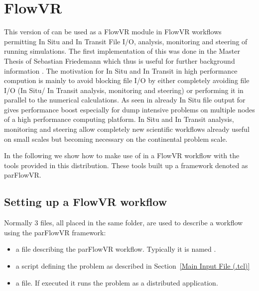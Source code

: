 \chapter{FlowVR}
\label{FlowVR}

This version of \parflow{} can be used as a FlowVR module in FlowVR workflows
\cite{dreherflexible2014}
permitting
In Situ and In Transit File I/O, analysis, monitoring and steering of running simulations.
The first implementation of this was done in the Master Thesis of Sebastian Friedemann
which thus is useful for further background information \cite{thesisFriedemann2018}.
The motivation for In Situ and In Transit in high performance compution is mainly to avoid
blocking file I/O by either completely avoiding file I/O (In Situ/ In Transit analysis,
monitoring and steering) or performing it in parallel to the numerical calculations.
As seen in \cite{thesisFriedemann2018} already In Situ file output for \parflow{} gives performance
boost especially
for dump intensive problems on multiple nodes of a high performance computing platform.
In Situ and In Transit analysis, monitoring and steering allow completely new scientific
workflows already useful on small scales but becoming necessary on the continental problem
scale.

In the following we show how to make use of \parflow{} in a FlowVR workflow with the tools
provided in this \parflow{} distribution. These tools built up a framework denoted as
parFlowVR.


\section{Setting up a FlowVR workflow}
Normally 3 files, all placed in the same folder, are used to describe a workflow using the parFlowVR framework:
\begin{itemize}
\item a  file describing the parFlowVR workflow. Typically it is named
.
\item a  script defining the \parflow{} problem as described in
Section~\ref{Main Input File (.tcl)}
\item a  file. If executed it runs the problem as a distributed application.
\end{itemize}
